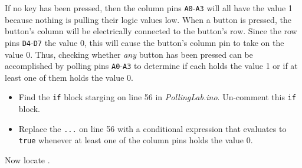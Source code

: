 If no key has been pressed, then the column pins \texttt{A0}-\texttt{A3} will
all have the value 1 because nothing is pulling their logic values low. When a
button is pressed, the button's column will be electrically connected to the
button's row. Since the row pins \texttt{D4}-\texttt{D7} the value 0, this
will cause the button's column pin to take on the value 0. Thus, checking
whether \textit{any} button has been pressed can be accomplished by polling
pins \texttt{A0}-\texttt{A3} to determine if each holds the value 1 or if at
least one of them holds the value 0.

    \begin{itemize}
    \item Find the \lstinline{if} block starging on line 56 in
        \textit{PollingLab.ino}. Un-comment this \lstinline{if} block.
        
    \item Replace the \lstinline{...} on line 56 with a conditional expression
        that evaluates to \texttt{true} whenever at least one of the column
        pins holds the value 0.
    \end{itemize}

Now locate .


